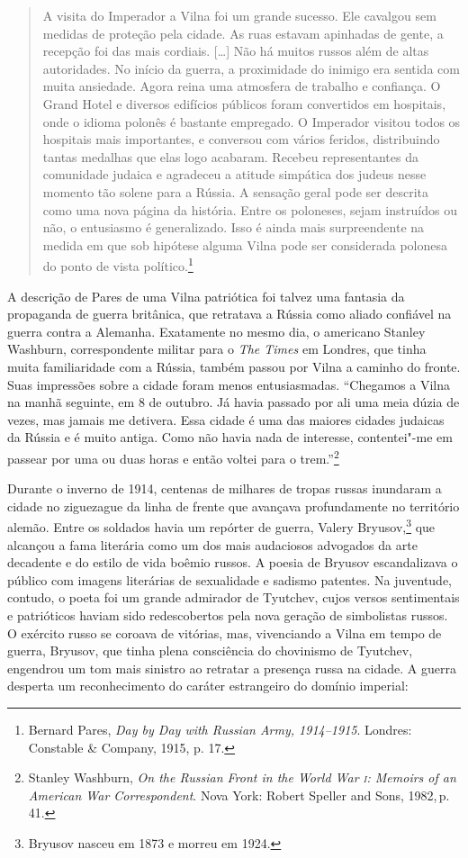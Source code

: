 \begin{quote}
A visita do Imperador a Vilna foi um grande sucesso. Ele cavalgou sem
medidas de proteção pela cidade. As ruas estavam apinhadas de gente, a
recepção foi das mais cordiais. [\ldots{}] Não há muitos russos além de
altas autoridades. No início da guerra, a proximidade do inimigo era
sentida com muita ansiedade. Agora reina uma atmosfera de trabalho e
confiança. O Grand Hotel e diversos edifícios públicos foram convertidos
em hospitais, onde o idioma polonês é bastante empregado. O Imperador
visitou todos os hospitais mais importantes, e conversou com vários
feridos, distribuindo tantas medalhas que elas logo acabaram. Recebeu
representantes da comunidade judaica e agradeceu a atitude simpática dos
judeus nesse momento tão solene para a Rússia. A sensação geral pode ser
descrita como uma nova página da história. Entre os poloneses, sejam
instruídos ou não, o entusiasmo é generalizado. Isso é ainda mais
surpreendente na medida em que sob hipótese alguma Vilna pode ser
considerada polonesa do ponto de vista político.\footnote{Bernard Pares, \textit{Day by Day with Russian Army, 1914--1915}. Londres: Constable \& Company, 1915, p. 17.} 
\end{quote}

A descrição de Pares de uma Vilna patriótica foi talvez uma fantasia da
propaganda de guerra britânica, que retratava a Rússia como aliado
confiável na guerra contra a Alemanha. Exatamente no mesmo dia, o
americano Stanley Washburn, correspondente militar para o \textit{The
Times} em Londres, que tinha muita familiaridade com a Rússia, também
passou por Vilna a caminho do fronte. Suas impressões sobre a cidade
foram menos entusiasmadas. ``Chegamos a Vilna na manhã seguinte, em 8 de
outubro. Já havia passado por ali uma meia dúzia de vezes, mas jamais
me detivera. Essa cidade é uma das maiores cidades judaicas da Rússia e
é muito antiga. Como não havia nada de interesse, contentei"-me em
passear por uma ou duas horas e então voltei para o trem.''\footnote{Stanley Washburn, \textit{On the Russian Front in the World War \textsc{i}: Memoirs of an American War Correspondent}. Nova York: Robert Speller and Sons, 1982,\,p.\,41.}

Durante o inverno de 1914, centenas de milhares de tropas russas
inundaram a cidade no ziguezague da linha de frente que avançava
profundamente no território alemão. Entre os soldados havia um repórter
de guerra, Valery Bryusov,\footnote{Bryusov nasceu em 1873 e morreu em 1924.} que alcançou a fama literária
como um dos mais audaciosos advogados da arte decadente e do estilo de
vida boêmio russos. A poesia de Bryusov escandalizava o público com
imagens literárias de sexualidade e sadismo patentes. Na juventude,
contudo, o poeta foi um grande admirador de Tyutchev, cujos versos
sentimentais e patrióticos haviam sido redescobertos pela nova geração
de simbolistas russos. O exército russo se coroava de vitórias, mas,
vivenciando a Vilna em tempo de guerra, Bryusov, que tinha plena
consciência do chovinismo de Tyutchev, engendrou um tom mais sinistro ao
retratar a presença russa na cidade. A guerra desperta um reconhecimento
do caráter estrangeiro do domínio imperial:

